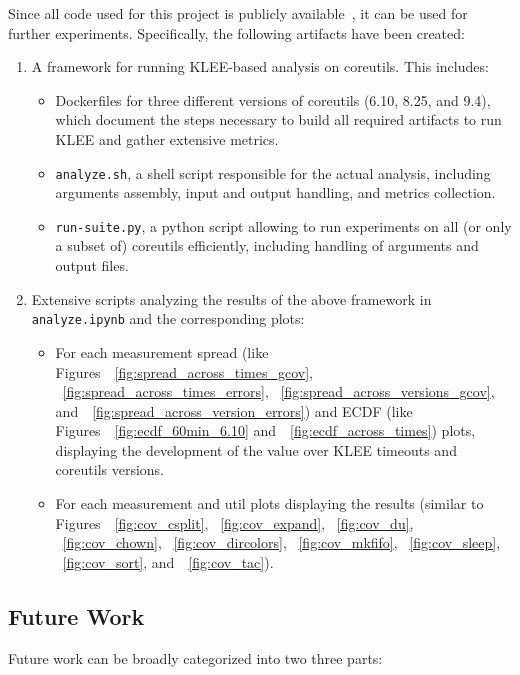 \documentclass{article}
\let\savedCite=\cite
\renewcommand{\cite}{\unskip~\savedCite}
\let\savedRef=\ref
\renewcommand{\ref}{\unskip~\savedRef}
\begin{document}
Since all code used for this project is publicly available\cite{GitHub}, it can be used for further experiments. Specifically, the following artifacts have been created:
\begin{enumerate}
    \item A framework for running KLEE-based analysis on coreutils. This includes:
          \begin{itemize}
              \item Dockerfiles for three different versions of coreutils (6.10, 8.25, and 9.4), which document the steps necessary to build all required artifacts to run KLEE and gather extensive metrics.
              \item \lstinline{analyze.sh}, a shell script responsible for the actual analysis, including arguments assembly, input and output handling, and metrics collection.
              \item \lstinline{run-suite.py}, a python script allowing to run experiments on all (or only a subset of) coreutils efficiently, including handling of arguments and output files.
          \end{itemize}
    \item Extensive scripts analyzing the results of the above framework in \lstinline{analyze.ipynb} and the corresponding plots:
          \begin{itemize}
              \item For each measurement spread (like Figures~\ref{fig:spread_across_times_gcov}, \ref{fig:spread_across_times_errors}, \ref{fig:spread_across_versions_gcov}, and~\ref{fig:spread_across_version_errors}) and ECDF (like Figures~\ref{fig:ecdf_60min_6.10} and~\ref{fig:ecdf_across_times}) plots, displaying the development of the value over KLEE timeouts and coreutils versions.
              \item For each measurement and util plots displaying the results (similar to Figures~\ref{fig:cov_csplit}, \ref{fig:cov_expand}, \ref{fig:cov_du}, \ref{fig:cov_chown}, \ref{fig:cov_dircolors}, \ref{fig:cov_mkfifo}, \ref{fig:cov_sleep}, \ref{fig:cov_sort}, and~\ref{fig:cov_tac}).
          \end{itemize}
\end{enumerate}

\subsection{Future Work}

Future work can be broadly categorized into two three parts:
\end{document}
